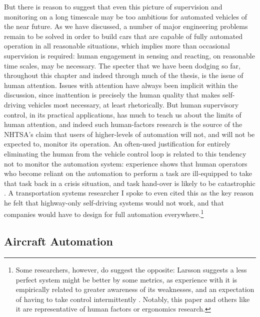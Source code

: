 But there is reason to suggest that even this picture of supervision
and monitoring on a long timescale may be too ambitious for automated
vehicles of the near future. As we have discussed, a number of major
engineering problems remain to be solved in order to build cars that
are capable of fully automated operation in all reasonable situations,
which implies more than occasional supervision is required: human engagement in
sensing and reacting, on reasonable time scales, may be necessary. The
specter that we have been dodging so far, throughout this chapter and
indeed through much of the thesis, is the issue of human attention.
Issues with attention have always been implicit within the discussion,
since inattention is precisely the human quality that makes
self-driving vehicles most necessary, at least rhetorically. But human
supervisory control, in its practical applications, has much to teach
us about the limits of human attention, and indeed such human-factors
research is the source of the NHTSA's claim that users of
higher-levels of automation will not, and will not be expected to,
monitor its operation. An often-used justification
for entirely eliminating the human from the vehicle control loop is
related to this tendency not to monitor the automation system:
experience shows that human operators who become reliant on the
automation to perform a task are ill-equipped to take that task back
in a crisis situation, and task hand-over is likely to be
catastrophic \cite{447} \cite{Chowpaper}. A transportation systems
researcher I spoke to 
even cited this as the key reason he felt that highway-only
self-driving systems would not work, and that companies would have to
design for full automation everywhere.\footnote{Some researchers,
  however, do suggest the opposite: Larsson suggests a less perfect
  system might be better 
  by some metrics, as experience with it is empirically related to
  greater awareness of its weaknesses, and an expectation of having to
take control intermittently \cite{larsson}. Notably, this paper and
others like it are representative of human factors or ergonomics research.}

\subsection{Aircraft Automation}

